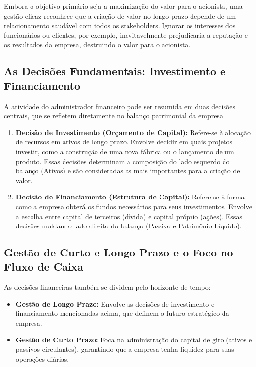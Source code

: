 \documentclass[
  a4paper,
]{book}
\providecommand{\tightlist}{%
  \setlength{\itemsep}{0pt}\setlength{\parskip}{0pt}}\usepackage{longtable,booktabs,array}
\begin{document}
Embora o objetivo primário seja a maximização do valor para o acionista,
uma gestão eficaz reconhece que a criação de valor no longo prazo
depende de um relacionamento saudável com todos os stakeholders. Ignorar
os interesses dos funcionários ou clientes, por exemplo, inevitavelmente
prejudicaria a reputação e os resultados da empresa, destruindo o valor
para o acionista.

\subsection{As Decisões Fundamentais: Investimento e
Financiamento}\label{as-decisuxf5es-fundamentais-investimento-e-financiamento}

A atividade do administrador financeiro pode ser resumida em duas
decisões centrais, que se refletem diretamente no balanço patrimonial da
empresa:

\begin{enumerate}
\def\labelenumi{\arabic{enumi}.}
\tightlist
\item
  \textbf{Decisão de Investimento (Orçamento de Capital):} Refere-se à
  alocação de recursos em ativos de longo prazo. Envolve decidir em
  quais projetos investir, como a construção de uma nova fábrica ou o
  lançamento de um produto. Essas decisões determinam a composição do
  lado esquerdo do balanço (Ativos) e são consideradas as mais
  importantes para a criação de valor.
\item
  \textbf{Decisão de Financiamento (Estrutura de Capital):} Refere-se à
  forma como a empresa obterá os fundos necessários para seus
  investimentos. Envolve a escolha entre capital de terceiros (dívida) e
  capital próprio (ações). Essas decisões moldam o lado direito do
  balanço (Passivo e Patrimônio Líquido).
\end{enumerate}

\subsection{Gestão de Curto e Longo Prazo e o Foco no Fluxo de
Caixa}\label{gestuxe3o-de-curto-e-longo-prazo-e-o-foco-no-fluxo-de-caixa}

As decisões financeiras também se dividem pelo horizonte de tempo:

\begin{itemize}
\tightlist
\item
  \textbf{Gestão de Longo Prazo:} Envolve as decisões de investimento e
  financiamento mencionadas acima, que definem o futuro estratégico da
  empresa.
\item
  \textbf{Gestão de Curto Prazo:} Foca na administração do capital de
  giro (ativos e passivos circulantes), garantindo que a empresa tenha
  liquidez para suas operações diárias.
\end{itemize}
\end{document}
